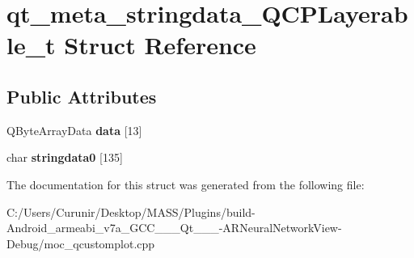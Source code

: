\hypertarget{structqt__meta__stringdata___q_c_p_layerable__t}{}\section{qt\+\_\+meta\+\_\+stringdata\+\_\+\+Q\+C\+P\+Layerable\+\_\+t Struct Reference}
\label{structqt__meta__stringdata___q_c_p_layerable__t}
\subsection*{Public Attributes}
\begin{DoxyCompactItemize}
\item 
\mbox{\label{structqt__meta__stringdata___q_c_p_layerable__t_a4bf9acefee24e0b4b53d19193d876011}} 
Q\+Byte\+Array\+Data {\bfseries data} \mbox{[}13\mbox{]}
\item 
\mbox{\label{structqt__meta__stringdata___q_c_p_layerable__t_a4cbb6959fe07b6eebc81a3be42d73300}} 
char {\bfseries stringdata0} \mbox{[}135\mbox{]}
\end{DoxyCompactItemize}


The documentation for this struct was generated from the following file\+:\begin{DoxyCompactItemize}
\item 
C\+:/\+Users/\+Curunir/\+Desktop/\+M\+A\+S\+S/\+Plugins/build-\/\+Android\+\_\+armeabi\+\_\+v7a\+\_\+\+G\+C\+C\+\_\+\_\+\_\+\+Qt\+\_\+\_\+\_-\/\+A\+R\+Neural\+Network\+View-\/\+Debug/moc\+\_\+qcustomplot.\+cpp\end{DoxyCompactItemize}
